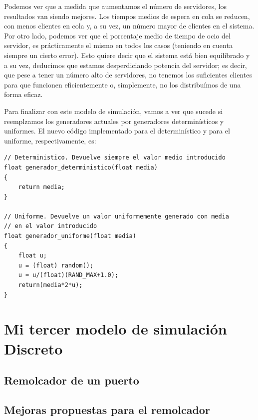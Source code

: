 \documentclass[11pt,a4paper]{report}
\begin{document}
Podemos ver que a medida que aumentamos el número de servidores, los resultados van siendo mejores. Los tiempos medios de espera en cola se reducen, con
menos clientes en cola y, a su vez, un número mayor de clientes en el sistema. Por otro lado, podemos ver que el porcentaje medio de tiempo de ocio del
servidor, es prácticamente el mismo en todos los casos (teniendo en cuenta siempre un cierto error). Esto quiere decir que el sistema está bien equilibrado
y a su vez, deducimos que estamos desperdiciando potencia del servidor; es decir, que pese a tener un número alto de servidores, no tenemos los suficientes
clientes para que funcionen eficientemente o, simplemente, no los distribuímos de una forma eficaz.

\newpage









Para finalizar con este modelo de simulación, vamos a ver que sucede si reemplzamos los generadores actuales por generadores determinísticos y uniformes.
El nuevo código implementado para el determinístico y para el uniforme, respectivamente, es:
\begin{lstlisting}
// Deterministico. Devuelve siempre el valor medio introducido
float generador_deterministico(float media)
{
	return media;
}

// Uniforme. Devuelve un valor uniformemente generado con media
// en el valor introducido
float generador_uniforme(float media)
{
	float u;
	u = (float) random();
	u = u/(float)(RAND_MAX+1.0);
	return(media*2*u);
}
\end{lstlisting}















\chapter{Mi tercer modelo de simulación Discreto}

\section{Remolcador de un puerto}


\section{Mejoras propuestas para el remolcador}
\end{document}
